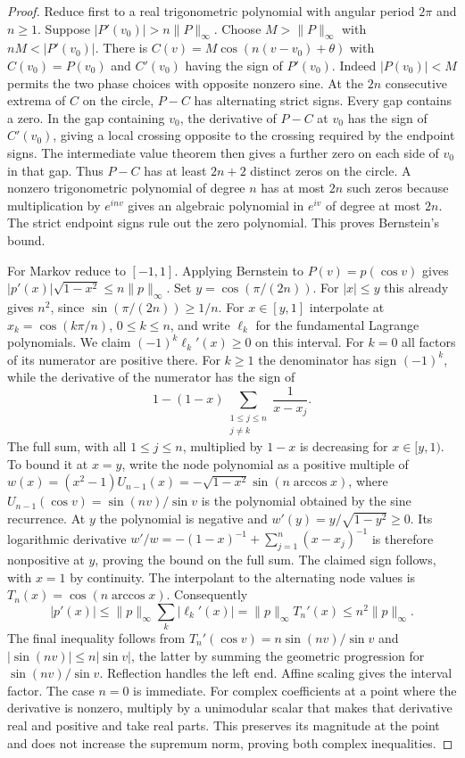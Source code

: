 \documentclass[11pt,oneside,openany]{book}
\theoremstyle{definition}
\theoremstyle{remark}
\begin{document}
\begin{proof}
Reduce first to a real trigonometric polynomial with angular
period $2\pi$ and $n\ge1$. Suppose $|P'(v_0)|>n\|P\|_\infty$.
Choose $M>\|P\|_\infty$ with $nM<|P'(v_0)|$.
There is $C(v)=M\cos(n(v-v_0)+\theta)$ with
$C(v_0)=P(v_0)$ and $C'(v_0)$ having the sign of $P'(v_0)$.
Indeed $|P(v_0)|<M$ permits the two phase choices with opposite
nonzero sine. At the $2n$ consecutive extrema of $C$ on the
circle, $P-C$ has alternating strict signs. Every gap contains a
zero. In the gap containing $v_0$, the derivative of $P-C$ at
$v_0$ has the sign of $C'(v_0)$, giving a local crossing opposite
to the crossing required by the endpoint signs. The intermediate
value theorem then gives a further zero on each side of $v_0$
in that gap. Thus $P-C$ has at least $2n+2$ distinct zeros on
the circle. A nonzero trigonometric polynomial of degree $n$
has at most $2n$ such zeros because multiplication by $e^{inv}$
gives an algebraic polynomial in $e^{iv}$ of degree at most $2n$.
The strict endpoint signs rule out the zero polynomial. This
proves Bernstein's bound.

For Markov reduce to $[-1,1]$. Applying Bernstein to $P(v)=p(\cos v)$
gives $|p'(x)|\sqrt{1-x^2}\le n\|p\|_\infty$. Set
$y=\cos(\pi/(2n))$. For $|x|\le y$ this already gives $n^2$,
since $\sin(\pi/(2n))\ge1/n$. For $x\in[y,1]$ interpolate at
$x_k=\cos(k\pi/n)$, $0\le k\le n$, and write $\ell_k$ for the
fundamental Lagrange polynomials. We claim
$(-1)^k\ell_k'(x)\ge0$ on this interval. For $k=0$ all factors
of its numerator are positive there. For $k\ge1$ the denominator
has sign $(-1)^k$, while the derivative of the numerator has
the sign of
\[
 1-(1-x)\sum_{\substack{1\le j\le n\\j\ne k}}\frac1{x-x_j}.
\]
The full sum, with all $1\le j\le n$, multiplied by $1-x$ is
decreasing for $x\in[y,1)$. To bound it at $x=y$, write the node
polynomial as a positive multiple of
$w(x)=(x^2-1)U_{n-1}(x)
     =-\sqrt{1-x^2}\sin(n\arccos x)$, where
$U_{n-1}(\cos v)=\sin(nv)/\sin v$ is the polynomial obtained
by the sine recurrence. At $y$ the polynomial is negative
and $w'(y)=y/\sqrt{1-y^2}\ge0$. Its logarithmic derivative
$w'/w=-(1-x)^{-1}+\sum_{j=1}^n(x-x_j)^{-1}$ is therefore
nonpositive at $y$, proving the bound on the full sum. The
claimed sign follows, with $x=1$ by continuity. The interpolant
to the alternating node values is $T_n(x)=\cos(n\arccos x)$.
Consequently
\[
 |p'(x)|\le\|p\|_\infty\sum_k|\ell_k'(x)|
       =\|p\|_\infty T_n'(x)\le n^2\|p\|_\infty .
\]
The final inequality follows from
$T_n'(\cos v)=n\sin(nv)/\sin v$ and
$|\sin(nv)|\le n|\sin v|$, the latter by summing the geometric
progression for $\sin(nv)/\sin v$. Reflection handles the left
end. Affine scaling gives the interval factor. The case $n=0$
is immediate. For complex coefficients at a point where the
derivative is nonzero, multiply by a unimodular scalar that makes
that derivative real and positive and take real parts. This
preserves its magnitude at the point and does not increase the
supremum norm, proving both complex inequalities.
\end{proof}
\end{document}
